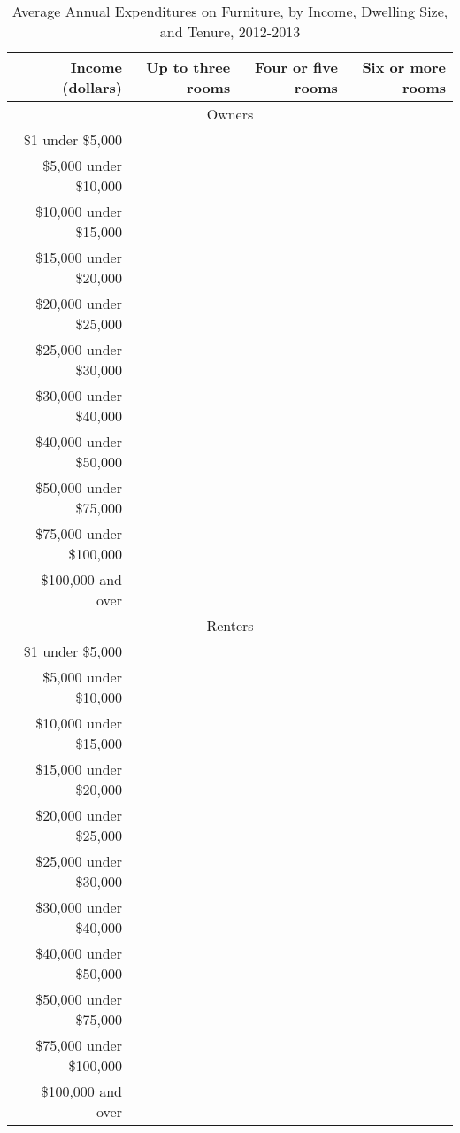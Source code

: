 \documentclass[article,11pt,letterpaper,fleqn]{article}
\theoremstyle{definition}
\numberwithin{equation}{section}
\begin{document}
\begin{table}[h!]
  \centering
  \caption{Average Annual Expenditures on Furniture, by Income, Dwelling Size, and Tenure, 2012-2013}
    \begin{tabular}{rrrr}
    \hline
    \hline
    Income (dollars) & Up to three rooms & Four or five rooms & Six or more rooms \\
    \hline
    \multicolumn{4}{c}{Owners} \\
    \$1 under \$5,000 &       &       &  \\
    \$5,000 under \$10,000 &       &       &  \\
    \$10,000 under \$15,000 &       &       &  \\
    \$15,000 under \$20,000 &       &       &  \\
    \$20,000 under \$25,000 &       &       &  \\
    \$25,000 under \$30,000 &       &       &  \\
    \$30,000 under \$40,000 &       &       &  \\
    \$40,000 under \$50,000 &       &       &  \\
    \$50,000 under \$75,000 &       &       &  \\
    \$75,000 under \$100,000 &       &       &  \\
    \$100,000 and over &       &       &  \\
    \multicolumn{4}{c}{Renters} \\
    \$1 under \$5,000 &       &       &  \\
    \$5,000 under \$10,000 &       &       &  \\
    \$10,000 under \$15,000 &       &       &  \\
    \$15,000 under \$20,000 &       &       &  \\
    \$20,000 under \$25,000 &       &       &  \\
    \$25,000 under \$30,000 &       &       &  \\
    \$30,000 under \$40,000 &       &       &  \\
    \$40,000 under \$50,000 &       &       &  \\
    \$50,000 under \$75,000 &       &       &  \\
    \$75,000 under \$100,000 &       &       &  \\
    \$100,000 and over &       &       &  \\
    \hline
    \hline
    \end{tabular}%
  \label{tab:impute_furniture}%
\end{table}%
\end{document}
